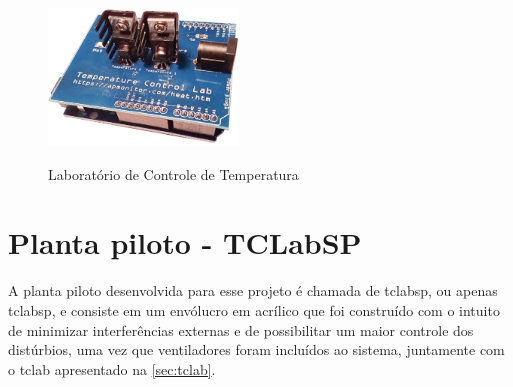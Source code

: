 \begin{figure}[h]
	\caption{Laboratório de Controle de Temperatura}
	\begin{center}
		\includegraphics[width=0.45\textwidth]{./5_images/tclab.png} 
		\label{fig:tclab}
	\end{center}
	\centering
\end{figure}

\section{Planta piloto - TCLabSP}
\label{sec:planta_piloto}

A planta piloto desenvolvida para esse projeto é chamada de \acrlong{tclabsp}, ou apenas \acrshort{tclabsp},
e consiste em um envólucro em acrílico que foi construído com o intuito de minimizar interferências
externas e de possibilitar um maior controle dos distúrbios, uma vez que ventiladores foram incluídos
ao sistema, juntamente com o \acrshort{tclab} apresentado na \cref{sec:tclab}.

